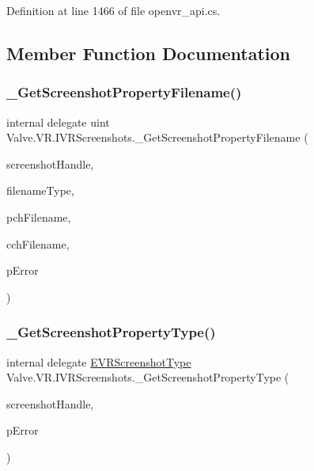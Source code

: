 Definition at line 1466 of file openvr\+\_\+api.\+cs.



\subsection{Member Function Documentation}
\mbox{\label{struct_valve_1_1_v_r_1_1_i_v_r_screenshots_a9bd7c0035c07384f2e690cfbbf210752}} 
\subsubsection{\texorpdfstring{\_GetScreenshotPropertyFilename()}{\_GetScreenshotPropertyFilename()}}
{\footnotesize\ttfamily internal delegate uint Valve.\+V\+R.\+I\+V\+R\+Screenshots.\+\_\+\+Get\+Screenshot\+Property\+Filename (\begin{DoxyParamCaption}\item[{uint}]{screenshot\+Handle,  }\item[{\mbox{\hyperlink{namespace_valve_1_1_v_r_a5a78926aed6b08da8e0e0b8f79911e34}{E\+V\+R\+Screenshot\+Property\+Filenames}}}]{filename\+Type,  }\item[{System.\+Text.\+String\+Builder}]{pch\+Filename,  }\item[{uint}]{cch\+Filename,  }\item[{ref \mbox{\hyperlink{namespace_valve_1_1_v_r_ac73c6dcb1af8fe045a626296a21e226b}{E\+V\+R\+Screenshot\+Error}}}]{p\+Error }\end{DoxyParamCaption})}

\mbox{\label{struct_valve_1_1_v_r_1_1_i_v_r_screenshots_a2a0f40d54fa11a1803abb2ddca3e3748}} 
\subsubsection{\texorpdfstring{\_GetScreenshotPropertyType()}{\_GetScreenshotPropertyType()}}
{\footnotesize\ttfamily internal delegate \mbox{\hyperlink{namespace_valve_1_1_v_r_a033ac579445f0992130b11ba62c9b7ae}{E\+V\+R\+Screenshot\+Type}} Valve.\+V\+R.\+I\+V\+R\+Screenshots.\+\_\+\+Get\+Screenshot\+Property\+Type (\begin{DoxyParamCaption}\item[{uint}]{screenshot\+Handle,  }\item[{ref \mbox{\hyperlink{namespace_valve_1_1_v_r_ac73c6dcb1af8fe045a626296a21e226b}{E\+V\+R\+Screenshot\+Error}}}]{p\+Error }\end{DoxyParamCaption})}


